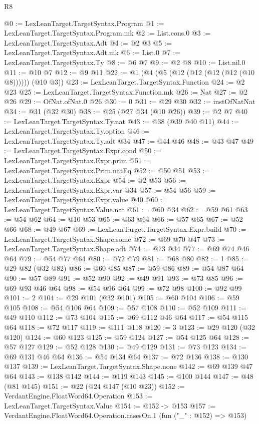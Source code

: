 \begin{lexlean}{R8}
\begin{coremodule}
@0 := LexLeanTarget.TargetSyntax.Program
@1 := LexLeanTarget.TargetSyntax.Program.mk
@2 := List.cons.{0}
@3 := LexLeanTarget.TargetSyntax.Adt
@4 := @2 @3
@5 := LexLeanTarget.TargetSyntax.Adt.mk
@6 := List.{0}
@7 := LexLeanTarget.TargetSyntax.Ty
@8 := @6 @7
@9 := @2 @8
@10 := List.nil.{0}
@11 := @10 @7
@12 := @9 @11
@22 := @1 (@4 (@5 (@12 (@12 (@12 (@12 (@10 @8)))))) (@10 @3))
@23 := LexLeanTarget.TargetSyntax.Function
@24 := @2 @23
@25 := LexLeanTarget.TargetSyntax.Function.mk
@26 := Nat
@27 := @2 @26
@29 := OfNat.ofNat.{0} @26
@30 := 0
@31 := @29 @30
@32 := instOfNatNat
@34 := @31 (@32 @30)
@38 := @25 (@27 @34 (@10 @26))
@39 := @2 @7
@40 := LexLeanTarget.TargetSyntax.Ty.nat
@43 := @38 (@39 @40 @11)
@44 := LexLeanTarget.TargetSyntax.Ty.option
@46 := LexLeanTarget.TargetSyntax.Ty.adt @34
@47 := @44 @46
@48 := @43 @47
@49 := LexLeanTarget.TargetSyntax.Expr.cond
@50 := LexLeanTarget.TargetSyntax.Expr.prim
@51 := LexLeanTarget.TargetSyntax.Prim.natEq
@52 := @50 @51
@53 := LexLeanTarget.TargetSyntax.Expr
@54 := @2 @53
@56 := LexLeanTarget.TargetSyntax.Expr.var @34
@57 := @54 @56
@59 := LexLeanTarget.TargetSyntax.Expr.value @40
@60 := LexLeanTarget.TargetSyntax.Value.nat
@61 := @60 @34
@62 := @59 @61
@63 := @54 @62
@64 := @10 @53
@65 := @63 @64
@66 := @57 @65
@67 := @52 @66
@68 := @49 @67
@69 := LexLeanTarget.TargetSyntax.Expr.build
@70 := LexLeanTarget.TargetSyntax.Shape.some
@72 := @69 @70 @47
@73 := LexLeanTarget.TargetSyntax.Shape.adt
@74 := @73 @34
@77 := @69 @74 @46 @64
@79 := @54 @77 @64
@80 := @72 @79
@81 := @68 @80
@82 := 1
@85 := @29 @82 (@32 @82)
@86 := @60 @85
@87 := @59 @86
@89 := @54 @87 @64
@90 := @57 @89
@91 := @52 @90
@92 := @49 @91
@93 := @73 @85
@96 := @69 @93 @46 @64
@98 := @54 @96 @64
@99 := @72 @98
@100 := @92 @99
@101 := 2
@104 := @29 @101 (@32 @101)
@105 := @60 @104
@106 := @59 @105
@108 := @54 @106 @64
@109 := @57 @108
@110 := @52 @109
@111 := @49 @110
@112 := @73 @104
@115 := @69 @112 @46 @64
@117 := @54 @115 @64
@118 := @72 @117
@119 := @111 @118
@120 := 3
@123 := @29 @120 (@32 @120)
@124 := @60 @123
@125 := @59 @124
@127 := @54 @125 @64
@128 := @57 @127
@129 := @52 @128
@130 := @49 @129
@131 := @73 @123
@134 := @69 @131 @46 @64
@136 := @54 @134 @64
@137 := @72 @136
@138 := @130 @137
@139 := LexLeanTarget.TargetSyntax.Shape.none
@142 := @69 @139 @47 @64
@143 := @138 @142
@144 := @119 @143
@145 := @100 @144
@147 := @48 (@81 @145)
@151 := @22 (@24 @147 (@10 @23))
@152 := VerdantEngine.FloatWord64.Operation
@153 := LexLeanTarget.TargetSyntax.Value
@154 := @152 -> @153
@157 := VerdantEngine.FloatWord64.Operation.casesOn.{1} (fun ("_" : @152) => @153)

\end{coremodule}
\end{lexlean}
